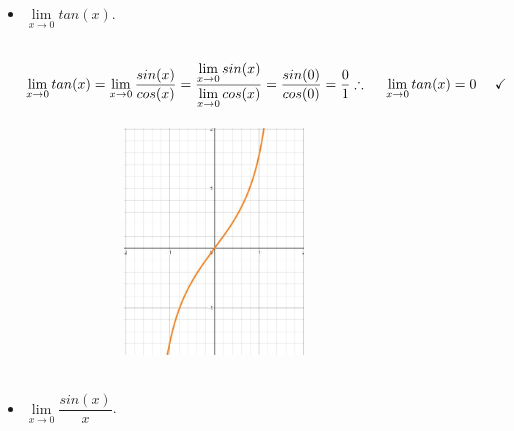 \documentclass[fleqn]{article}
\begin{document}
\begin{enumerate}
\begin{itemize}
      \item $\lim\limits_{x \to 0} tan(x)$. 

        \textcolor{hwColor}{
          \\
          $
            \lim\limits_{x \to 0} tan(x)=\lim\limits_{x \to 0} \dfrac{sin(x)}{cos(x)}
            =\dfrac{\lim\limits_{x \to 0} sin(x)}{\lim\limits_{x \to 0} cos(x)}
            =\dfrac{sin(0)}{cos(0)}=\dfrac{0}{1}
            \\
            \\
            \\
            \therefore ~~~~ \lim\limits_{x \to 0} tan(x)=0 ~~~~ \checkmark
            \\
          $
          \\
          \\
          \includegraphics[width=10cm, height=6cm]{Seven.JPG}
          \\
          \\
        }

      \item $\lim\limits_{x \to 0} \dfrac{sin(x)}{x}$. 


\end{itemize}
\end{enumerate}
\end{document}
